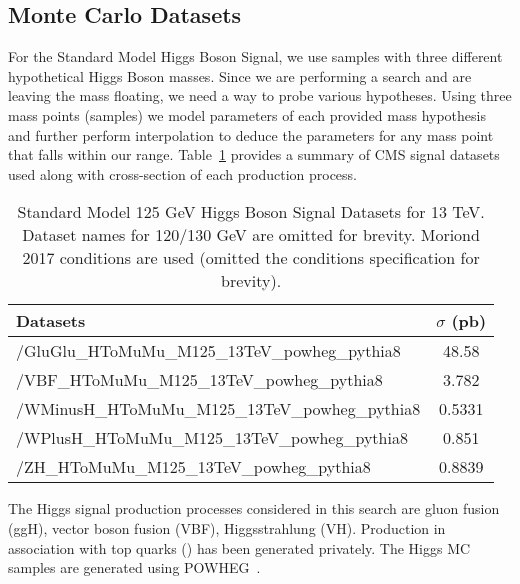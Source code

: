 \subsection{Monte Carlo Datasets}
For the Standard Model Higgs Boson Signal, we use samples with three different hypothetical Higgs Boson masses. Since we are performing a search and are leaving the mass floating, we need a way to probe various hypotheses. Using three mass points (samples) we model parameters of each provided mass hypothesis and further perform interpolation to deduce the parameters for any mass point that falls within our range. Table~\ref{table:higgs_data_signaldatasets} provides a summary of CMS signal datasets used along with cross-section of each production process.
\begin{table}
    \caption{Standard Model 125 GeV Higgs Boson Signal Datasets for 13 TeV. Dataset names for 120/130 GeV are omitted for brevity. Moriond 2017 conditions are used (omitted the conditions specification for brevity).}
    \label{table:higgs_data_signaldatasets}
    \begin{center}
        \begin{tabular}{ l  c}
            \hline
            Datasets & $\sigma$ (pb)\\
            \hline
            {/GluGlu\_HToMuMu\_M125\_13TeV\_powheg\_pythia8} & 48.58\\
            {/VBF\_HToMuMu\_M125\_13TeV\_powheg\_pythia8} & 3.782\\
            {/WMinusH\_HToMuMu\_M125\_13TeV\_powheg\_pythia8} & 0.5331\\
            {/WPlusH\_HToMuMu\_M125\_13TeV\_powheg\_pythia8} & 0.851\\
            {/ZH\_HToMuMu\_M125\_13TeV\_powheg\_pythia8} & 0.8839 \\
            \hline
        \end{tabular}
    \end{center}
\end{table}
The Higgs signal production processes considered in this search are gluon
fusion (ggH), vector boson fusion (VBF), Higgsstrahlung (VH). Production in
association with top quarks (\ttH) has been generated privately. The Higgs MC samples are generated using {\sc POWHEG}~\cite{Nason:2004rx}.
